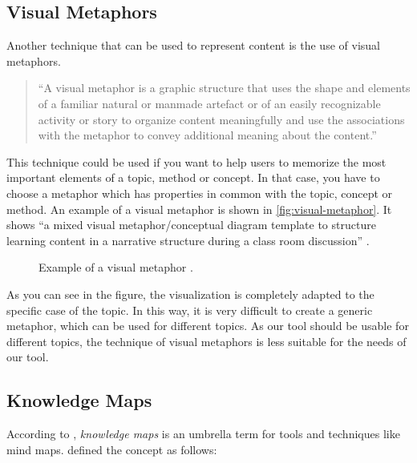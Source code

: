 \subsection{Visual Metaphors}\label{sec:visual-metaphors}
Another technique that can be used to represent content is the use of visual metaphors.

\begin{quote}
``A visual metaphor is a graphic structure that uses the shape and elements of a familiar natural or manmade artefact or of an easily recognizable activity or story to organize content meaningfully and use the associations with the metaphor to convey additional meaning about the content.'' \hfill \citep{eppler-2006}
\end{quote}

This technique could be used if you want to help users to memorize the most important elements of a topic, method or concept. In that case, you have to choose a metaphor which has properties in common with the topic, concept or method. \citep{eppler-2006} An example of a visual metaphor is shown in \autoref{fig:visual-metaphor}. It shows ``a mixed visual metaphor/conceptual diagram template to structure learning content in a narrative structure during a class room discussion'' \citep{eppler-2006}. 

\begin{figure}[H]
	\centering
	\caption{Example of a visual metaphor \citep{eppler-2006}.}
	\label{fig:visual-metaphor}
\end{figure}

As you can see in the figure, the visualization is completely adapted to the specific case of the topic. In this way, it is very difficult to create a generic metaphor, which can be used for different topics. As our tool should be usable for different topics, the technique of visual metaphors is less suitable for the needs of our tool.


\subsection{Knowledge Maps}\label{sec:knowledge-maps}
According to \cite{knowledgemapsbalaid}, \textit{knowledge maps} is an umbrella term for tools and techniques like mind maps. \cite{knowledgemapsodonnell} defined the concept as follows:

